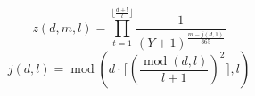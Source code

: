 \documentclass{minimal}
\begin{document}
  \begin{equation*}
z\left(d,m,l\right)=\prod_{t=1}^{\lfloor{\frac{d+l}{l}}\rfloor}\frac{1}{(Y+1)^{\frac{m-j\left(d,1\right)}{365}}}
  \end{equation*}
  \begin{equation*}
j\left(d,l\right)=\operatorname{mod}\left(d\cdot{\lceil{\left(\frac{\operatorname{mod}\left(d,l\right)}{l+1}\right)^{2}}\rceil},l\right)
  \end{equation*}
\end{document}
